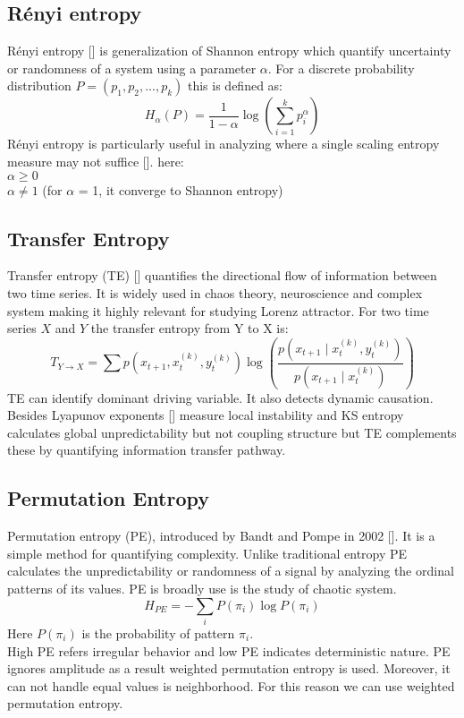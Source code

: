 \documentclass[%
 reprint,
 amsmath,amssymb,
 aps,
 floatfix,
]{revtex4-2}
\begin{document}
\subsection{Rényi entropy}
Rényi entropy [] is generalization of Shannon entropy which quantify uncertainty or randomness of a system using a parameter $\alpha$. For a discrete probability distribution $P = (p_1,p_2,...,p_k)$ this is defined as:
\begin{equation}
	H_\alpha (P) = \frac{1}{1 - \alpha} \log (\sum_{i=1}^{k} p_{i}^{\alpha})
\end{equation}
R\'enyi entropy is particularly useful in analyzing where a single scaling entropy measure may not suffice []. 
here:\\
$\alpha \geq 0$\\ 
$\alpha \neq 1$ (for $\alpha$ = 1, it converge to Shannon entropy)\\
\subsection{Transfer Entropy}
Transfer entropy (TE) [] quantifies the directional flow of information between two time series. It is widely used in chaos theory, neuroscience and complex system making it highly relevant for studying Lorenz attractor. For two time series $X$ and $Y$ the transfer entropy from Y to X is:
\begin{equation}
T_{Y\to X} = \sum p(x_{t+1}, x_{t}^{(k)}, y_{t}^{(k)}) \log\left( \frac{p(x_{t+1} \mid x_{t}^{(k)}, y_{t}^{(k)})}{p(x_{t+1} \mid x_{t}^{(k)})} \right)
\end{equation}
TE can identify dominant driving variable. It also detects dynamic causation. Besides Lyapunov exponents [] measure local instability and KS entropy calculates global unpredictability but not coupling structure but TE complements these by quantifying information transfer pathway.
\subsection{Permutation Entropy}
Permutation entropy (PE), introduced by Bandt and Pompe in 2002 []. It is a simple method for quantifying complexity. Unlike traditional entropy PE calculates the unpredictability or randomness of a signal by analyzing the ordinal patterns of its values. PE is broadly use is the study of chaotic system.
\begin{equation}
	H_{PE} = -\sum_{i} P(\pi_i) \log P(\pi_i)
\end{equation}
Here $P(\pi_i)$ is the probability of pattern $\pi_i$.\\
High PE refers irregular behavior and low PE indicates deterministic nature. PE ignores amplitude as a result weighted permutation entropy is used. Moreover, it can not handle equal values is neighborhood. For this reason we can use weighted permutation entropy.
\end{document}
